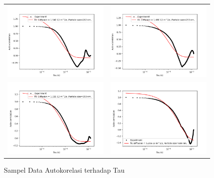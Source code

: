 \begin{figure}[H]
  \ContinuedFloat
  \begin{longtable}{p{7cm}p{7cm}}
    
    \includegraphics[width=8cm]{Images/AutoCor_Hijau_Data100-01.png}
    &
    \includegraphics[width=8cm]{Images/AutoCor_Merah_Data99-01.png} \\

    \includegraphics[width=8cm]{Images/AutoCor_Hijau_Data1000-01.png}
    \centering{Laser Hijau}
    &
    \includegraphics[width=8cm]{Images/AutoCor_Merah_Data1000-01.png} 
    \centering{Laser Merah}\\
  \end{longtable}

  \caption{Sampel Data Autokorelasi terhadap Tau}
\end{figure}


